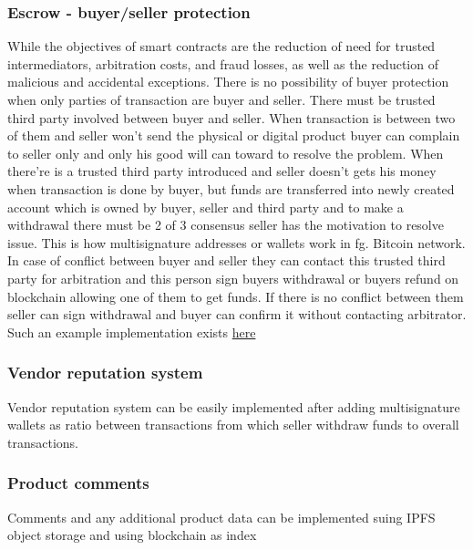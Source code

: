 \documentclass[journal]{IEEEtran} %
\begin{document}
        \subsubsection{Escrow - buyer/seller protection}
            While the objectives of smart contracts are the reduction of need for trusted intermediators, arbitration costs, and fraud losses, as well as the reduction of malicious and accidental exceptions. There is no possibility of buyer protection when only parties of transaction are buyer and seller. There must be trusted third party involved between buyer and seller. When transaction is between two of them and seller won't send the physical or digital product buyer can complain to seller only and only his good will can toward to resolve the problem. When there're is a trusted third party introduced and seller doesn't gets his money when transaction is done by buyer, but funds are transferred into newly created account which is owned by buyer, seller and third party and to make a withdrawal there must be 2 of 3 consensus seller has the motivation to resolve issue. This is how multisignature addresses or wallets work in fg. Bitcoin network. In case of conflict between buyer and seller they can contact this trusted third party for arbitration and this person sign buyers withdrawal or buyers refund on blockchain allowing one of them to get funds. If there is no conflict between them seller can sign withdrawal and buyer can confirm it without contacting arbitrator. Such an example implementation exists \href{https://solidity-by-example.org/app/multi-sig-wallet/}{here}\\
            
        \subsubsection{Vendor reputation system}
            Vendor reputation system can be easily implemented after adding multisignature wallets as ratio between transactions from which seller withdraw funds to overall transactions.\\
            
        \subsubsection{Product comments}
            Comments and any additional product data can be implemented suing IPFS object storage and using blockchain as index\\
            
\end{document}
